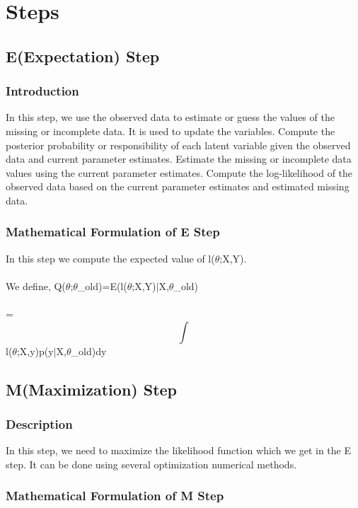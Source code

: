 \section{Steps}
\subsection{E(Expectation) Step}
\subsubsection{Introduction}In this step, we use the observed data to estimate or guess the values of the missing or incomplete data. It is used to update the variables. 
Compute the posterior probability or responsibility of each latent variable given the observed data and current parameter estimates.
Estimate the missing or incomplete data values using the current parameter estimates.
Compute the log-likelihood of the observed data based on the current parameter estimates and estimated missing data.

\subsubsection{Mathematical Formulation of E Step}
In this step we compute the expected value of  l($\theta$;X,Y).
\\\\We define,
           Q($\theta$;$\theta$_{old})=E(l($\theta$;X,Y)\(|\)X,$\theta$_{old})
\\\\ =$$\int$$l($\theta$;X,y)p(y\(|\)X,$\theta$_{old})dy


\subsection{M(Maximization) Step}
\subsubsection{Description}In this step, we need to maximize the likelihood function which we get in the E step. It can be done using several optimization numerical methods.
\subsubsection{Mathematical Formulation of M Step}

